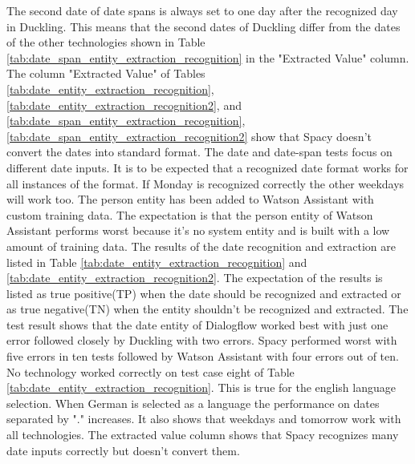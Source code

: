 The second date of date spans is always set to one day after the recognized day in Duckling.
This means that the second dates of Duckling differ from the dates of the other technologies
shown in Table \ref{tab:date_span_entity_extraction_recognition} in the "Extracted Value" column.
The column "Extracted Value" of Tables \ref{tab:date_entity_extraction_recognition},
\ref{tab:date_entity_extraction_recognition2},
and \ref{tab:date_span_entity_extraction_recognition},
\ref{tab:date_span_entity_extraction_recognition2} show that Spacy doesn't 
convert the dates into standard format.
The date and date-span tests focus on different date inputs.
It is to be expected that a recognized date format works for 
all instances of the format.
If Monday is recognized correctly the other weekdays will work too. 
The person entity has been added to Watson Assistant with custom training data.
The expectation is that the person entity of Watson Assistant performs worst because 
it's no system entity and is built with a low amount of training data.
The results of the date recognition and extraction are listed in Table \ref{tab:date_entity_extraction_recognition}
and \ref{tab:date_entity_extraction_recognition2}.
The expectation of the results is listed as true positive(TP) when the date should be recognized and extracted or as true negative(TN)
when the entity shouldn't be recognized and extracted.
The test result shows that the date entity of Dialogflow worked best with just one error
followed closely by Duckling with two errors.
Spacy performed worst with five errors in ten tests followed by Watson Assistant with four errors out of ten.
No technology worked correctly on test case eight of Table \ref{tab:date_entity_extraction_recognition}.
This is true for the english language selection.
When German is selected as a language the performance on dates separated by
"." increases.
It also shows that weekdays and tomorrow work with all technologies.
The extracted value column shows that Spacy recognizes many date inputs correctly but doesn't convert them.

